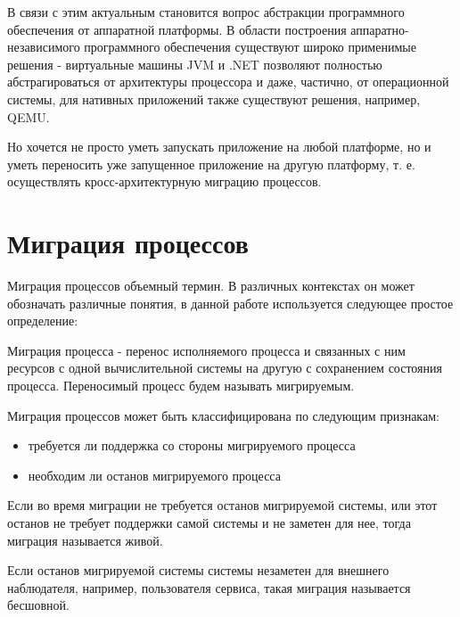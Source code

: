 В связи с этим актуальным становится вопрос абстракции программного обеспечения от аппаратной платформы. В области построения аппаратно-независимого программного обеспечения существуют широко применимые решения - виртуальные машины JVM и .NET позволяют полностью абстрагироваться от архитектуры процессора и даже, частично, от операционной системы, для нативных приложений также существуют решения, например, QEMU.

Но хочется не просто уметь запускать приложение на любой платформе, но и уметь переносить уже запущенное приложение на другую платформу, т. е. осуществлять кросс-архитектурную миграцию процессов.

\section{Миграция процессов}

Миграция процессов объемный термин. В различных контекстах он может обозначать различные понятия, в данной работе используется следующее простое определение:

\begin{Def}\label{migration}
Миграция процесса - перенос исполняемого процесса и связанных с ним ресурсов с одной вычислительной системы на другую с сохранением состояния процесса. Переносимый процесс будем называть мигрируемым.
\end{Def}

Миграция процессов может быть классифицирована по следующим признакам:

\begin{itemize}

    \item требуется ли поддержка со стороны мигрируемого процесса
    \item необходим ли останов мигрируемого процесса

\end{itemize}

\begin{Def}\label{live_migration}
Если во время миграции не требуется останов мигрируемой системы, или этот останов не требует поддержки самой системы и не заметен для нее, тогда миграция называется живой.
\end{Def}

\begin{Def}\label{seamless_live_migration}
Если останов мигрируемой системы системы незаметен для внешнего наблюдателя, например, пользователя сервиса, такая миграция называется бесшовной.
\end{Def}


